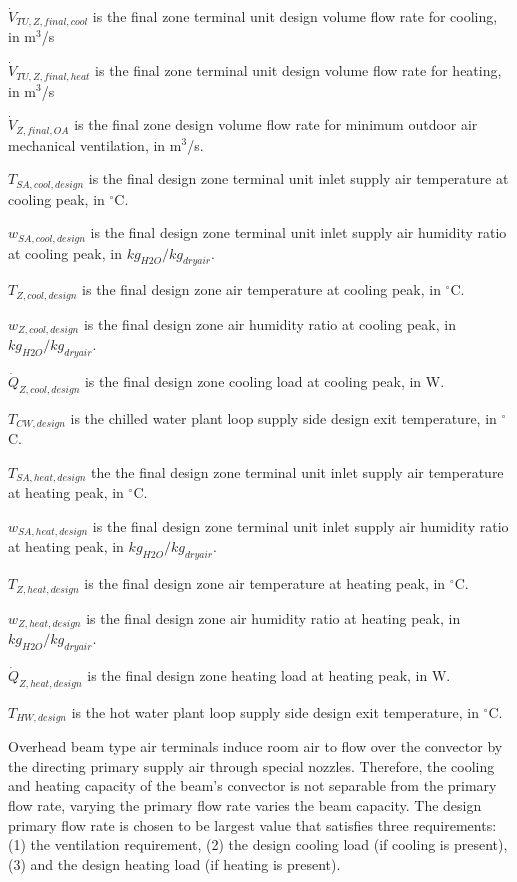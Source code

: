 \({\dot V_{TU,Z,final,cool} }\) is the final zone terminal unit design volume flow rate for cooling, in m\(^{3}\)/s

\({\dot V_{TU,Z,final,heat} }\) is the final zone terminal unit design volume flow rate for heating, in m\(^{3}\)/s

\({\dot V_{Z,final,OA} }\) is the final zone design volume flow rate for minimum outdoor air mechanical ventilation, in m\(^{3}\)/s.

\({T_{SA,cool,design } }\) is the final design zone terminal unit inlet supply air temperature at cooling peak, in \(^{\circ}\)C.

\({w_{SA,cool,design } }\) is the final design zone terminal unit inlet supply air humidity ratio at cooling peak, in \(kg_{H2O}/kg_{dryair}\).

\({T_{Z,cool,design } }\) is the final design zone air temperature at cooling peak, in \(^{\circ}\)C.

\({w_{Z,cool,design } }\) is the final design zone air humidity ratio at cooling peak, in \(kg_{H2O}/kg_{dryair}\).

\({\dot Q_{Z,cool,design } }\) is the final design zone cooling load at cooling peak, in W.

\({T_{CW,design}}\) is the chilled water plant loop supply side design exit temperature, in \(^{\circ}\)C.

\({T_{SA,heat,design } }\) the the final design zone terminal unit inlet supply air temperature at heating peak, in \(^{\circ}\)C.

\({w_{SA,heat,design } }\) is the final design zone terminal unit inlet supply air humidity ratio at heating peak, in \(kg_{H2O}/kg_{dryair}\).

\({T_{Z,heat,design } }\) is the final design zone air temperature at heating peak, in \(^{\circ}\)C.

\({w_{Z,heat,design } }\) is the final design zone air humidity ratio at heating peak, in \(kg_{H2O}/kg_{dryair}\).

\({\dot Q_{Z,heat,design } }\) is the final design zone heating load at heating peak, in W.

\({T_{HW,design}}\) is the hot water plant loop supply side design exit temperature, in \(^{\circ}\)C.

Overhead beam type air terminals induce room air to flow over the convector by the directing primary supply air through special nozzles. Therefore, the cooling and heating capacity of the beam's convector is not separable from the primary flow rate, varying the primary flow rate varies the beam capacity. The design primary flow rate is chosen to be largest value that satisfies three requirements: (1) the ventilation requirement, (2) the design cooling load (if cooling is present), (3) and the design heating load (if heating is present).

